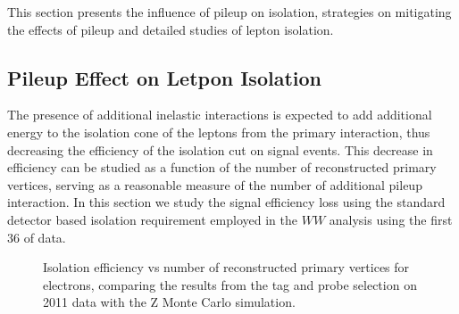 This section presents the influence of pileup on isolation, strategies on mitigating the effects of pileup and detailed studies of lepton isolation.


\subsection{Pileup Effect on Letpon Isolation}


The presence of additional inelastic interactions is expected to add 
additional energy to the isolation cone of the leptons from the primary 
interaction, thus decreasing the efficiency of the isolation cut on signal 
events. This decrease in efficiency can be studied as a function of the 
number of reconstructed primary vertices, serving as a reasonable measure 
of the number of additional pileup interaction. In this section we study
the signal efficiency loss using the standard detector based isolation
requirement employed in the $WW$ analysis using the first $36$ \ipb of data. 

\begin{figure}[!htbp]
\begin{center}
\caption{Isolation efficiency vs number of reconstructed primary vertices for electrons, comparing the 
results from the tag and probe selection on 2011 data with the Z Monte Carlo simulation.}
\label{fig:eleIsoEff_TagAndProbe_vs_NVertices}
\end{center}
\end{figure}

